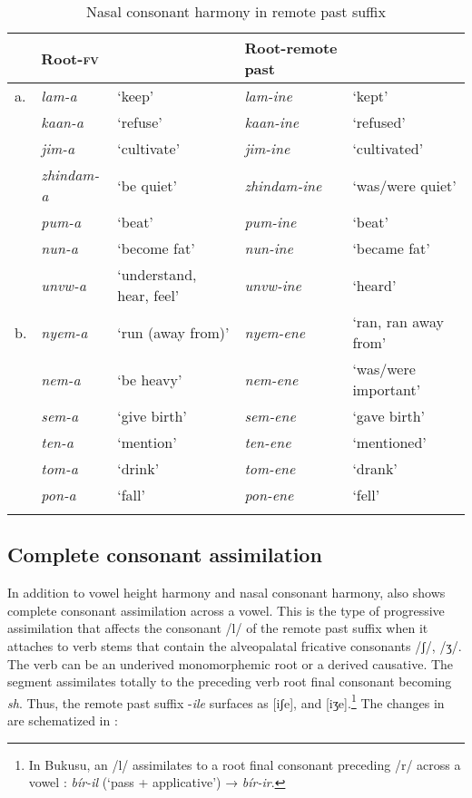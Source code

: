 \documentclass[output=paper]{langsci/langscibook}
\begin{document}
\begin{table}
\small
\begin{tabularx}{\textwidth}{llQll}
\lsptoprule
 & Root-\textsc{fv} &  & Root-remote past & \\
\midrule
a. & \textit{lam-a} & `keep' & \textit{lam-ine} & `kept' \\
 & \textit{kaan-a} & `refuse' & \textit{kaan-ine} & `refused' \\
 & \textit{jim-a} & `cultivate' & \textit{jim-ine} & `cultivated' \\
 & \textit{zhindam-a} & `be quiet' & \textit{zhindam-ine} & `was/were quiet' \\
 & \textit{pum-a} & `beat' & \textit{pum-ine} & `beat' \\
 & \textit{nun-a} & `become fat' & \textit{nun-ine} & `became fat' \\
 & \textit{unvw-a} & `understand, hear, feel' & \textit{unvw-ine} & `heard' \\
\tablevspace
b. & \textit{nyem-a} & `run (away from)' & \textit{nyem-ene} & `ran, ran away from' \\
 & \textit{nem-a} & `be heavy' & \textit{nem-ene} & `was/were important' \\
 & \textit{sem-a} & `give birth' & \textit{sem-ene} & `gave birth' \\
 & \textit{ten-a} & `mention' & \textit{ten-ene} & `mentioned' \\
 & \textit{tom-a} & `drink' & \textit{tom-ene} & `drank' \\
 & \textit{pon-a} & `fall' & \textit{pon-ene} & `fell' \\

\lspbottomrule
\end{tabularx}

\caption{Nasal consonant harmony in remote past suffix}
\label{tab:4.kawasha}

\end{table}

\subsection{Complete consonant assimilation}


In addition to vowel height harmony and nasal consonant harmony,  also shows complete consonant assimilation across a vowel. This is the type of progressive assimilation that affects the consonant /l/ of the remote past suffix when it attaches to verb stems that contain the alveopalatal fricative consonants /ʃ/, /ʒ/. The verb can be an underived monomorphemic root or a derived causative. The segment assimilates totally to the preceding verb root final consonant becoming \textit{sh}. Thus, the remote past suffix -\textit{ile} surfaces as [iʃe], and [iʒe].\footnote{In Bukusu, an /l/ assimilates to a root final consonant preceding /r/ across a vowel \citep{hyman2003b}: \textit{bír-il} (‘pass + applicative’) → \textit{bír-ir}.} The changes in  are schematized in :
\end{document}
